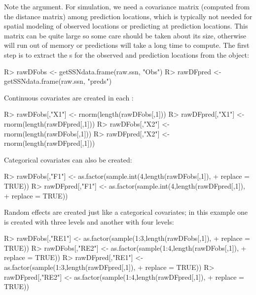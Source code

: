 \documentclass[nojss]{jss}
\renewenvironment{Schunk}{\vspace{\topsep}}{\vspace{\topsep}}
\begin{document}
Note the  argument.  For simulation, we need a
covariance matrix (computed from the distance matrix) among prediction
locations, which is typically not needed for spatial modeling of
observed locations or predicting at prediction locations.  This matrix
can be quite large so some care should be taken about its size,
otherwise  will run out of memory or predictions will take
a long time to compute.  The first step is to extract the
 s for the observed and prediction
locations from the  object:

\begin{Schunk}
\begin{Sinput}
R> rawDFobs <- getSSNdata.frame(raw.ssn, "Obs")
R> rawDFpred <- getSSNdata.frame(raw.ssn, "preds")
\end{Sinput}
\end{Schunk}

Continuous covariates are created in each :

\begin{Schunk}
\begin{Sinput}
R> rawDFobs[,"X1"] <- rnorm(length(rawDFobs[,1]))
R> rawDFpred[,"X1"] <- rnorm(length(rawDFpred[,1]))
R> rawDFobs[,"X2"] <- rnorm(length(rawDFobs[,1]))
R> rawDFpred[,"X2"] <- rnorm(length(rawDFpred[,1]))
\end{Sinput}
\end{Schunk}

Categorical covariates can also be created:

\begin{Schunk}
\begin{Sinput}
R> rawDFobs[,"F1"] <- as.factor(sample.int(4,length(rawDFobs[,1]),
+     replace = TRUE))
R> rawDFpred[,"F1"] <- as.factor(sample.int(4,length(rawDFpred[,1]),
+     replace = TRUE))
\end{Sinput}
\end{Schunk}

Random effects are created just like a categorical covariates; in this
example one is created with three levels and another with four levels:

\begin{Schunk}
\begin{Sinput}
R> rawDFobs[,"RE1"] <- as.factor(sample(1:3,length(rawDFobs[,1]),
+     replace = TRUE))
R> rawDFobs[,"RE2"] <- as.factor(sample(1:4,length(rawDFobs[,1]),
+     replace = TRUE))
R> rawDFpred[,"RE1"] <- as.factor(sample(1:3,length(rawDFpred[,1]),
+     replace = TRUE))
R> rawDFpred[,"RE2"] <- as.factor(sample(1:4,length(rawDFpred[,1]),
+     replace = TRUE))
\end{Sinput}
\end{Schunk}
\end{document}
